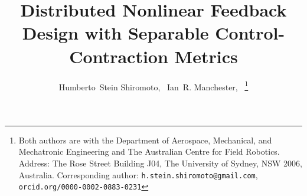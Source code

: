 \documentclass[10pt,twocolumn,twoside]{IEEEtran}
\newcounter{para}
\theoremstyle{plain}
\theoremstyle{definition}
\theoremstyle{remark}
\begin{document}
%
\title{Distributed Nonlinear Feedback Design with Separable Control-Contraction Metrics}
%
%
%

\author{Humberto~Stein Shiromoto,~
        Ian~R. Manchester,~%
\thanks{Both authors are with the Department of Aerospace, Mechanical, and Mechatronic Engineering and The Australian Centre for Field Robotics. Address: The
Rose Street Building J04, The University of Sydney, NSW 2006, Australia. Corresponding author: {\tt h.stein.shiromoto@gmail.com}, {\tt orcid.org/0000-0002-0883-0231}}%
}

% 
%



% 
\end{document}
